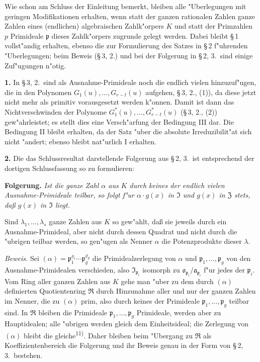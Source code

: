 \smallskip

\noindent
Wie schon am Schluss der Einleitung bemerkt, bleiben alle "Uberlegungen mit geringen Modifikationen erhalten, wenn statt der ganzen rationalen Zahlen ganze Zahlen eines (endlichen) algebraischen Zahlk"orpers $K$ und statt der Primzahlen $p$ Primideale $\mathfrak{p}$ dieses Zahlk"orpers zugrunde gelegt werden. Dabei bleibt \S\,1 vollst"andig erhalten, ebenso die zur Formulierung des Satzes in \S\,2 f"uhrenden "Uberlegungen; beim Beweis (\S\,3, 2.) und bei der Folgerung in \S\,2, 3.\ sind einige Zuf"ugungen n"otig.

\medskip\noindent\textbf{1.}
In \S\,3, 2.\ sind als Ausnahme-Primideale noch die endlich vielen hinzuzuf"ugen, die in den Polynomen $G_1(u),\ldots,G_{r-t}(u)$ aufgehen, \S\,3, 2., (1)), da diese jetzt nicht mehr als primitiv vorausgesetzt werden k"onnen. Damit ist dann das Nichtverschwinden der Polynome $G^*_1(u),\ldots,G^*_{r-t}(u)$ (\S\,3, 2., (2)) gew"ahrleistet; es stellt dies eine Versch"arfung der Bedingung III dar. Die Bedingung II bleibt erhalten, da der Satz "uber die absolute Irreduzibilit"at sich nicht "andert; ebenso bleibt nat"urlich I erhalten.

\medskip\noindent\textbf{2.}
Die das Schlussresultat darstellende Folgerung aus \S\,2, 3.\ ist entsprechend der dortigen Schlussfassung so zu formulieren:

\noindent\textbf{Folgerung.}
\textit{Ist die ganze Zahl $\alpha$ aus $K$ durch keines der endlich vielen Ausnahme-Primideale teilbar, so folgt f"ur $\alpha \cdot g(x)$ in $\mathfrak{I}$ und $g(x)$ in $\mathfrak{Z}$ stets, da\ss{} $g(x)$ in $\mathfrak{I}$ liegt.}

Sind $\lambda_1,\ldots,\lambda_s$ ganze Zahlen aus $K$ so gew"ahlt, da\ss{} sie jeweils durch ein Ausnahme-Primideal, aber nicht durch dessen Quadrat und nicht durch die "ubrigen teilbar werden, so gen"ugen als Nenner $\alpha$ die Potenzprodukte dieser $\lambda$.

\noindent\textit{Beweis.}
Sei $(\alpha) = \mathfrak{p}_1^{\varrho_1} \cdots \mathfrak{p}_g^{\varrho_g}$ die Primidealzerlegung von $\alpha$ und $\mathfrak{p}_1,\ldots,\mathfrak{p}_g$ von den Ausnahme-Primidealen verschieden, also $\mathfrak{I}_{\mathfrak{p}_i}$ isomorph zu $\mathfrak{o}_{\mathfrak{p}_i}/\mathfrak{a}_{\mathfrak{p}_i}$ f"ur jedes der $\mathfrak{p}_i$. Vom Ring aller ganzen Zahlen aus $K$ gehe man "uber zu dem durch $(\alpha)$ definierten Quotientenring $\mathfrak{R}$ durch Hinzunahme aller und nur der ganzen Zahlen im Nenner, die zu $(\alpha)$ prim, also durch keines der Primideale $\mathfrak{p}_1,\ldots,\mathfrak{p}_g$ teilbar sind. In $\mathfrak{R}$ bleiben die Primideale $\mathfrak{p}_1,\ldots,\mathfrak{p}_g$ Primideale, werden aber zu Hauptidealen; alle "ubrigen werden gleich dem Einheitsideal; die Zerlegung von $(\alpha)$ bleibt die gleiche\textsuperscript{11)}. Daher bleiben beim "Ubergang zu $\mathfrak{R}$ als Koeffizientenbereich die Folgerung und ihr Beweis genau in der Form von \S\,2, 3.\ bestehen.

